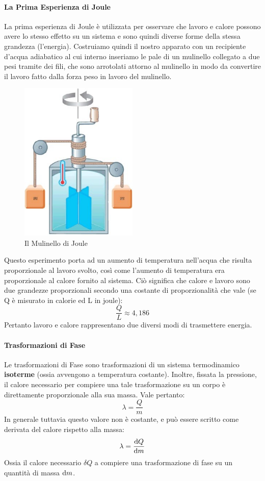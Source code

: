 \documentclass{article}
\begin{document}
\paragraph{La Prima Esperienza di Joule}
La prima esperienza di Joule è utilizzata per osservare che lavoro e calore possono avere lo stesso effetto su un sistema e sono quindi diverse forme della stessa grandezza (l'energia). Costruiamo quindi il nostro apparato con un recipiente d'acqua adiabatico al cui interno inseriamo le pale di un mulinello collegato a due pesi tramite dei fili, che sono arrotolati attorno al mulinello in modo da convertire il lavoro fatto dalla forza peso in lavoro del mulinello.
\begin{figure}[H]
    \centering
    \includegraphics[width=0.5\textwidth]{mulinello_joule.jpg}
    \caption{Il Mulinello di Joule}
\end{figure}
Questo esperimento porta ad un aumento di temperatura nell'acqua che risulta proporzionale al lavoro svolto, così come l'aumento di temperatura era proporzionale al calore fornito al sistema. Ciò significa che calore e lavoro sono due grandezze proporzionali secondo una costante di proporzionalità che vale (se Q è misurato in calorie ed L in joule):
\[\frac{Q}{L}\approx4,186\]
Pertanto lavoro e calore rappresentano due diversi modi di trasmettere energia.  
\paragraph{Trasformazioni di Fase}
Le trasformazioni di Fase sono trasformazioni di un sistema termodinamico \textbf{isoterme} (ossia avvengono a temperatura costante). Inoltre, fissata la pressione, il calore necessario per compiere una tale trasformazione su un corpo è direttamente proporzionale alla sua massa. Vale pertanto:
\[\lambda=\frac{Q}{m}\]
In generale tuttavia questo valore non è costante, e può essere scritto come derivata del calore rispetto alla massa:
\[\lambda=\dv{Q}{m}\]
Ossia il calore necessario $\delta Q$ a compiere una trasformazione di fase su un quantità di massa $\dif m$.
\end{document}
